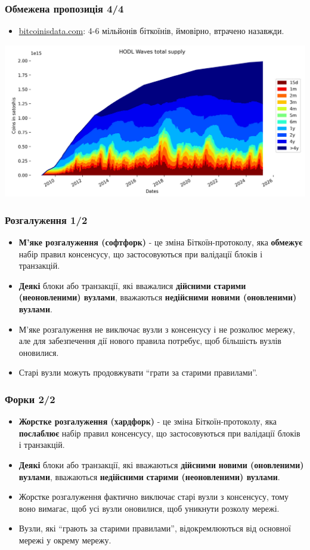 \documentclass{beamer}
\begin{document}
\begin{frame}
  \frametitle{Обмежена пропозиція 4/4}
  \begin{itemize}
  \item \href{https://bitcoinisdata.com}{bitcoinisdata.com}: 4-6 мільйонів
    біткоїнів, ймовірно, втрачено назавжди.
  \end{itemize}
  \includegraphics[width=\textwidth]{utxo-age}
\end{frame}

\begin{frame}
  \frametitle{Розгалуження 1/2}
  \begin{itemize}
  \item \textbf{М'яке розгалуження (софтфорк)} - це зміна Біткоїн-протоколу, яка
    \textbf{обмежує} набір правил консенсусу, що застосовуються при валідації
    блоків і транзакцій.
  \item \textbf{Деякі} блоки або транзакції, які вважалися \textbf{дійсними}
    \textbf{старими (неоновленими) вузлами}, вважаються \textbf{недійсними}
    \textbf{новими (оновленими) вузлами}.
  \item М'яке розгалуження не виключає вузли з консенсусу і не розколює мережу,
    але для забезпечення дії нового правила потребує, щоб більшість вузлів
    оновилися.
  \item Старі вузли можуть продовжувати ``грати за старими правилами''.
  \end{itemize}
\end{frame}

\begin{frame}
  \frametitle{Форки 2/2}
  \begin{itemize}
  \item \textbf{Жорстке розгалуження (хардфорк)} - це зміна Біткоїн-протоколу,
    яка \textbf{послаблює} набір правил консенсусу, що застосовуються при
    валідації блоків і транзакцій.
  \item \textbf{Деякі} блоки або транзакції, які вважаються \textbf{дійсними}
    \textbf{новими (оновленими) вузлами}, вважаються \textbf{недійсними}
    \textbf{старими (неоновленими) вузлами}.
  \item Жорстке розгалуження фактично виключає старі вузли з консенсусу, тому
    воно вимагає, щоб усі вузли оновилися, щоб уникнути розколу мережі.
  \item Вузли, які ``грають за старими правилами'', відокремлюються від основної
    мережі у окрему мережу.
  \end{itemize}
\end{frame}
\end{document}
